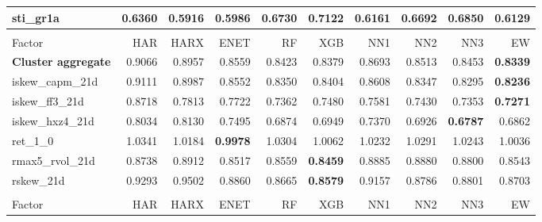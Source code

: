\begin{longtable}{>{\raggedright\arraybackslash}p{2.6cm}rrrrrrrrr}
sti\_gr1a & 0.6360 & \textbf{\cellcolor{blue!10}0.5916} & \cellcolor{blue!10}0.5986 & 0.6730 & 0.7122 & \cellcolor{blue!10}0.6161 & 0.6692 & 0.6850 & \cellcolor{blue!10}0.6129 \\
\hline
\multicolumn{10}{@{}l}{\textit{Panel K. Short-Term Reversal}} \\
\hline
Factor & HAR & HARX & ENET & RF & XGB & NN1 & NN2 & NN3 & EW \\
\hline
\textbf{Cluster aggregate} & 0.9066 & \cellcolor{blue!10}0.8957 & \cellcolor{blue!10}0.8559 & \cellcolor{blue!10}0.8423 & \cellcolor{blue!10}0.8379 & \cellcolor{blue!10}0.8693 & \cellcolor{blue!10}0.8513 & \cellcolor{blue!10}0.8453 & \textbf{\cellcolor{blue!10}0.8339} \\
iskew\_capm\_21d & 0.9111 & \cellcolor{blue!10}0.8987 & \cellcolor{blue!10}0.8552 & \cellcolor{blue!10}0.8350 & \cellcolor{blue!10}0.8404 & \cellcolor{blue!10}0.8608 & \cellcolor{blue!10}0.8347 & \cellcolor{blue!10}0.8295 & \textbf{\cellcolor{blue!10}0.8236} \\
iskew\_ff3\_21d & 0.8718 & \cellcolor{blue!10}0.7813 & \cellcolor{blue!10}0.7722 & \cellcolor{blue!10}0.7362 & \cellcolor{blue!10}0.7480 & \cellcolor{blue!10}0.7581 & \cellcolor{blue!10}0.7430 & \cellcolor{blue!10}0.7353 & \textbf{\cellcolor{blue!10}0.7271} \\
iskew\_hxz4\_21d & 0.8034 & 0.8130 & \cellcolor{blue!10}0.7495 & \cellcolor{blue!10}0.6874 & \cellcolor{blue!10}0.6949 & \cellcolor{blue!10}0.7370 & \cellcolor{blue!10}0.6926 & \textbf{\cellcolor{blue!10}0.6787} & \cellcolor{blue!10}0.6862 \\
ret\_1\_0 & 1.0341 & \cellcolor{blue!10}1.0184 & \textbf{\cellcolor{blue!10}0.9978} & \cellcolor{blue!10}1.0304 & \cellcolor{blue!10}1.0062 & \cellcolor{blue!10}1.0232 & \cellcolor{blue!10}1.0291 & \cellcolor{blue!10}1.0243 & \cellcolor{blue!10}1.0036 \\
rmax5\_rvol\_21d & 0.8738 & 0.8912 & \cellcolor{blue!10}0.8517 & \cellcolor{blue!10}0.8559 & \textbf{\cellcolor{blue!10}0.8459} & 0.8885 & 0.8880 & 0.8800 & \cellcolor{blue!10}0.8543 \\
rskew\_21d & 0.9293 & 0.9502 & \cellcolor{blue!10}0.8860 & \cellcolor{blue!10}0.8665 & \textbf{\cellcolor{blue!10}0.8579} & \cellcolor{blue!10}0.9157 & \cellcolor{blue!10}0.8786 & \cellcolor{blue!10}0.8801 & \cellcolor{blue!10}0.8703 \\
\hline
\multicolumn{10}{@{}l}{\textit{Panel L. Size}} \\
\hline
Factor & HAR & HARX & ENET & RF & XGB & NN1 & NN2 & NN3 & EW \\

\end{longtable}
